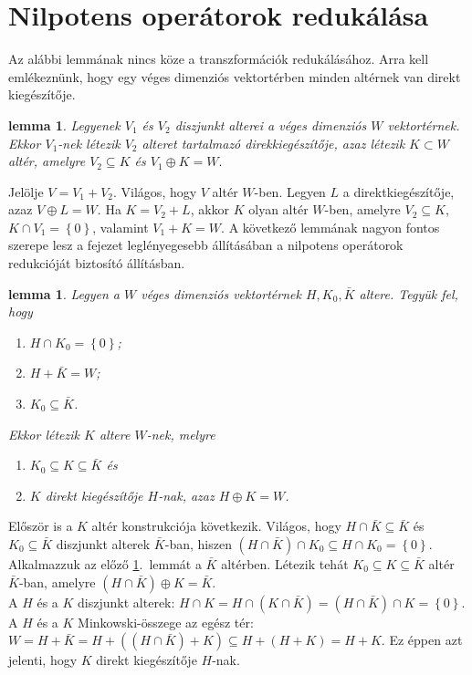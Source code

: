 \documentclass[a4paper, showtrims]{memoir}
\makeatletter
\renewenvironment{proof}[1][\proofname]
    {\par\pushQED{\qed}%
    \normalfont \topsep6\p@\@plus6\p@\relax
    \trivlist
    \item[\hskip\labelsep
        \itshape
    #1\@addpunct{:}]\ignorespaces}
    {\popQED\endtrivlist\@endpefalse}
\theoremstyle{plain}
\newtheorem{lemma}[proposition]{lemma}
\theoremstyle{remark}
\theoremstyle{definition}
\makeatother
\begin{document}
\section{Nilpotens operátorok redukálása}
Az alábbi lemmának nincs köze a transzformációk redukálásához.
Arra kell emlékeznünk, hogy egy véges dimenziós vektortérben minden altérnek van direkt kiegészítője.
\begin{lemma}
	Legyenek $V_1$ és $V_2$ diszjunkt alterei a véges dimenziós $W$ vektortérnek.
	Ekkor $V_1$-nek létezik $V_2$ alteret tartalmazó direkkiegészítője,
	azaz
	létezik $K\subset W$ altér, amelyre $V_2\subseteq K$ és $V_1\oplus K=W.$
	\label{felb0}
\end{lemma}
\begin{proof}
	Jelölje $V=V_1+V_2$.
	Világos, hogy $V$ altér $W$-ben.
	Legyen $L$ a direktkiegészítője, azaz $V\oplus L=W$.
	Ha $K=V_2+L$, akkor $K$ olyan altér $W$-ben,
	amelyre $V_2\subseteq K$, $K\cap V_1=\left\{ 0 \right\}$, valamint
	$V_1+K=W$.
\end{proof}
A következő lemmának nagyon fontos szerepe lesz a fejezet leglényegesebb állításában
a nilpotens operátorok redukcióját biztosító állításban.
\begin{lemma}\label{lem:felb}
	Legyen a $W$ véges dimenziós vektortérnek $H,K_0,\bar{K}$ altere.
	Tegyük fel, hogy
	\begin{enumerate}\firmlist
		\item $H\cap K_0=\left\{ 0 \right\}$;
		\item $H+\bar{K}=W$;
		\item $K_0\subseteq\bar{K}$.
	\end{enumerate}
	Ekkor létezik $K$ altere $W$-nek, melyre
	\begin{enumerate}\firmlist
		\item $K_0\subseteq K\subseteq\bar{K}$ és
		\item $K$ direkt kiegészítője $H$-nak, azaz
		      $H\oplus K=W$.\qedhere
	\end{enumerate}
\end{lemma}
\begin{proof}
	Először is a $K$ altér konstrukciója következik.
	Világos, hogy $H\cap\bar{K}\subseteq\bar{K}$ és $K_0\subseteq\bar{K}$ diszjunkt alterek
	$\bar{K}$-ban, hiszen
	\(
	\left( H\cap\bar{K} \right)\cap K_0\subseteq
	H\cap K_0=\left\{ 0 \right\}.
	\)
	Alkalmazzuk az előző \ref{felb0}.~lemmát a $\bar{K}$ altérben.
	Létezik tehát $K_0\subseteq K\subseteq \bar{K}$ altér $\bar{K}$-ban,
	amelyre
	\(
	\left( H\cap\bar{K} \right)\oplus K=\bar{K}.
	\)
	\\
	A $H$ és a $K$ diszjunkt alterek:
	\(
	H\cap K=H\cap\left( K\cap \bar{K} \right)=\left( H\cap\bar{K} \right)\cap K=\left\{ 0 \right\}.
	\)
	\\
	A $H$ és a $K$ Minkowski-összege az egész tér:
	\(
	W=H+\bar{K}
	=
	H+\left( (H\cap\bar{K})+K \right)
	\subseteq
	H+(H+K)
	=
	H+K.
	\)
	Ez éppen azt jelenti, hogy $K$ direkt kiegészítője $H$-nak.
\end{proof}
\end{document}
